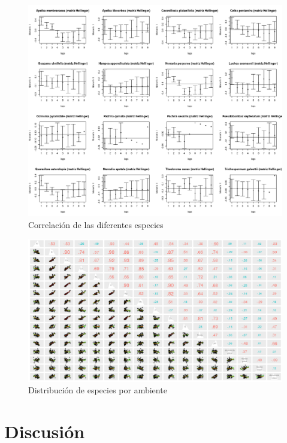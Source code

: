 \documentclass[11pt,]{article}
\begin{document}
\begin{figure}
\centering
\includegraphics[width=1.10000\textwidth]{ecologia_espacial_files/figure-markdown_github/unnamed-chunk-10-1.png}
\caption{Correlación de las diferentes especies\label{diversidad}}
\end{figure}

\begin{figure}
\centering
\includegraphics[width=1.10000\textwidth]{matriz_correlacion_suelo_abun_riq_spearman.png}
\caption{Distribución de especies por ambiente\label{ambiente}}
\end{figure}

\section{Discusión}\label{discusiuxf3n}
\end{document}
